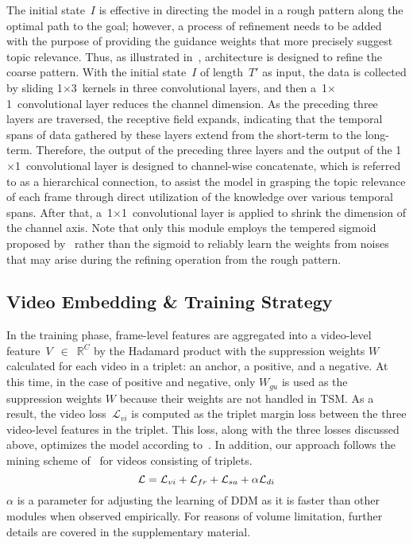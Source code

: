 \documentclass[10pt,twocolumn,letterpaper]{article}
\begin{document}
            The initial state~$I$ is effective in directing the model in a rough pattern along the optimal path to the goal; however, a process of refinement needs to be added with the purpose of providing the guidance weights that more precisely suggest topic relevance. Thus, as illustrated in~, architecture is designed to refine the coarse pattern. With the initial state~$I$ of length~$T'$ as input, the data is collected by sliding 1$\times$3~kernels in three convolutional layers, and then a~1$\times$1~convolutional layer reduces the channel dimension. As the preceding three layers are traversed, the receptive field expands, indicating that the temporal spans of data gathered by these layers extend from the short-term to the long-term. Therefore, the output of the preceding three layers and the output of the 1$\times$1~convolutional layer is designed to channel-wise concatenate, which is referred to as a hierarchical connection, to assist the model in grasping the topic relevance of each frame through direct utilization of the knowledge over various temporal spans. After that, a~1$\times$1~convolutional layer is applied to shrink the dimension of the channel axis. Note that only this module employs the tempered sigmoid proposed by~\cite{papernot2021tempered} rather than the sigmoid to reliably learn the weights from noises that may arise during the refining operation from the rough pattern.
  
    \subsection{Video Embedding \& Training Strategy}
        
        In the training phase, frame-level features are aggregated into a video-level feature~$V$~$\in $~$\mathbb{R}^{C}$ by the Hadamard product with the suppression weights $W$ calculated for each video in a triplet: an anchor, a positive, and a negative. At this time, in the case of positive and negative, only $W_{gu}$ is used as the suppression weights $W$ because their weights are not handled in TSM. As a result, the video loss~$\mathcal{L}_{vi}$ is computed as the triplet margin loss between the three video-level features in the triplet. This loss, along with the three losses discussed above, optimizes the model according to~. In addition, our approach follows the mining scheme of~\cite{kordopatis2019visil} for videos consisting of triplets.
        \begin{equation}
            \small
            \mathcal{L} = \mathcal{L}_{vi} + \mathcal{L}_{fr} + \mathcal{L}_{sa} + \alpha\mathcal{L}_{di}
            \label{eq:loss}
        \end{equation}         
        \noindent $\alpha$ is a parameter for adjusting the learning of DDM as it is faster than other modules when observed empirically. For reasons of volume limitation, further details are covered in the supplementary material.
        
\end{document}

